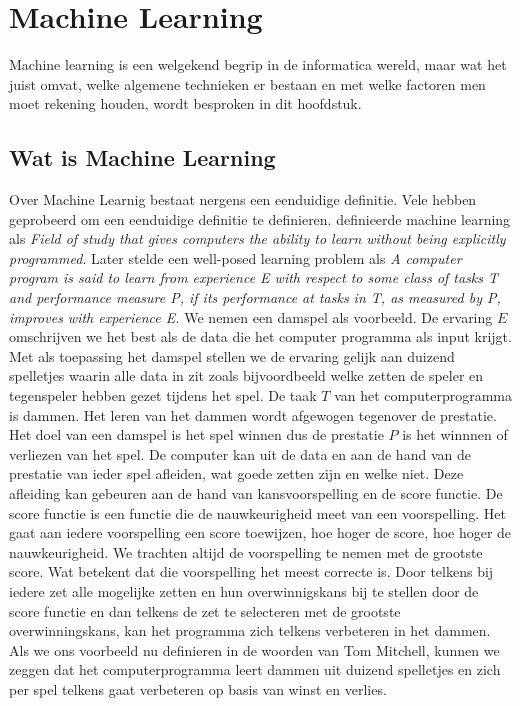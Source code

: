 
\chapter{Machine Learning}\label{Machine Learning}

Machine learning is een welgekend begrip in de informatica wereld, maar wat het juist omvat, welke algemene technieken er bestaan en met welke factoren men moet rekening houden, wordt besproken in dit hoofdstuk.

\section{Wat is Machine Learning}\label{Wat is Machine Learning}

Over Machine Learnig bestaat nergens een eenduidige definitie. Vele hebben geprobeerd om een eenduidige definitie te definieren. \citet{samuel2000some} definieerde machine learning als
\newline
\newline
\textit{Field of study that gives computers the ability to learn without being explicitly programmed}.
\newline
\newline
Later stelde \citet{mitchell1997machine} een well-posed learning problem als 
\newline
\newline
\textit{A computer program is said to learn from experience E with respect to some class of tasks T and performance measure P, if its performance at tasks in T, as measured by P, improves with experience E.}
\newline
%
We nemen een damspel als voorbeeld. De ervaring $E$ omschrijven we het best als de data die het computer programma als input krijgt. Met als toepassing het damspel stellen we de ervaring gelijk aan duizend spelletjes waarin alle data in zit zoals bijvoordbeeld welke zetten de speler en tegenspeler hebben gezet tijdens het spel. De taak $T$ van het computerprogramma is dammen. Het leren van het dammen wordt afgewogen tegenover de prestatie. Het doel van een damspel is het spel winnen dus de prestatie $P$ is het winnnen of verliezen van het spel. De computer kan uit de data en aan de hand van de prestatie van ieder spel afleiden, wat goede zetten zijn en welke niet. Deze afleiding kan gebeuren aan de hand van kansvoorspelling en de score functie. De score functie is een functie die de nauwkeurigheid meet van een voorspelling. Het gaat aan iedere voorspelling een score toewijzen, hoe hoger de score, hoe hoger de nauwkeurigheid. We trachten altijd  de voorspelling te nemen met de grootste score. Wat betekent dat die voorspelling het meest correcte is. Door telkens bij iedere zet alle mogelijke zetten en hun overwinnigskans bij te stellen door de score functie en dan telkens de zet te selecteren met de grootste overwinningskans, kan het programma zich telkens verbeteren in het dammen. Als we ons voorbeeld nu definieren in de woorden van Tom Mitchell, kunnen we zeggen dat het computerprogramma leert dammen uit duizend spelletjes en zich per spel telkens gaat verbeteren op basis van winst en verlies.\\    
